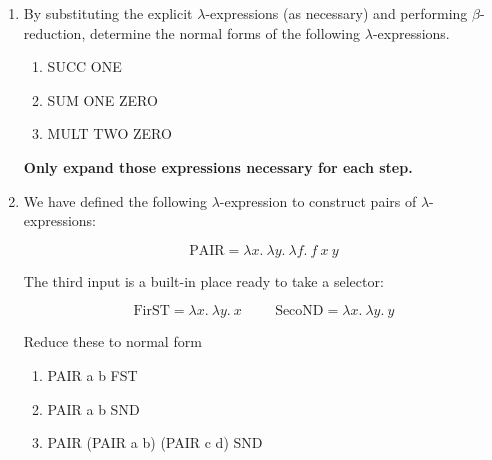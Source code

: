 \documentclass[11pt]{report}
\begin{document}
\begin{enumerate}
	\item By substituting the explicit $\lambda$-expressions (as necessary) and performing $\beta$-reduction, determine the normal forms of the following $\lambda$-expressions. 

	\begin{enumerate}
		\item SUCC ONE
		\item SUM ONE ZERO
		\item MULT TWO ZERO
	\end{enumerate}

	{\bf Only expand those expressions necessary for each step.}

	\item We have defined the following $\lambda$-expression to construct pairs of $\lambda$-expressions:
	
	$$\text{PAIR} = \lambda x. \ \lambda y. \ \lambda f. \ f \ x \ y$$

	The third input is a built-in place ready to take a selector:

	$$\text{FirST} = \lambda x. \ \lambda y. \ x \hspace{1cm} \text{SecoND} = \lambda x. \ \lambda y. \ y$$

	 Reduce these to normal form 

		\begin{enumerate}
			\item PAIR a b FST \vspace{0.2cm}
			\item PAIR a b SND \vspace{0.2cm}
			\item PAIR (PAIR a b) (PAIR c d) SND
		\end{enumerate}

%
%	
%
%


\end{enumerate}
\end{document}
